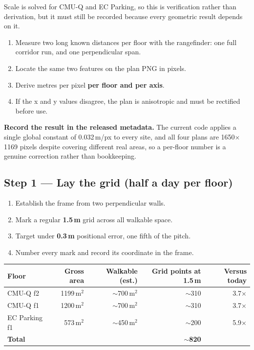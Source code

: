 \documentclass[11pt,a4paper]{article}
\begin{document}
Scale is solved for CMU-Q and EC Parking, so this is verification rather than derivation,
but it must still be recorded because every geometric result depends on it.

\begin{enumerate}
\item Measure two long known distances per floor with the rangefinder: one full corridor
run, and one perpendicular span.
\item Locate the same two features on the plan PNG in pixels.
\item Derive metres per pixel \textbf{per floor and per axis}.
\item If the x and y values disagree, the plan is anisotropic and must be rectified
before use.
\end{enumerate}

\textbf{Record the result in the released metadata.} The current code applies a single
global constant of 0.032\,m/px to every site, and all four plans are 1650$\times$1169
pixels despite covering different real areas, so a per-floor number is a genuine
correction rather than bookkeeping.

\subsection{Step 1 --- Lay the grid (half a day per floor)}

\begin{enumerate}
\item Establish the frame from two perpendicular walls.
\item Mark a regular \textbf{1.5\,m} grid across all walkable space.
\item Target under \textbf{0.3\,m} positional error, one fifth of the pitch.
\item Number every mark and record its coordinate in the frame.
\end{enumerate}

\begin{center}\small
\begin{tabular}{@{}lrrrr@{}}
\toprule
Floor & Gross area & Walkable (est.) & Grid points at 1.5\,m & Versus today \\ \midrule
CMU-Q f2 & 1199\,m$^2$ & $\sim$700\,m$^2$ & $\sim$310 & 3.7$\times$ \\
CMU-Q f1 & 1200\,m$^2$ & $\sim$700\,m$^2$ & $\sim$310 & 3.7$\times$ \\
EC Parking f1 & 573\,m$^2$ & $\sim$450\,m$^2$ & $\sim$200 & 5.9$\times$ \\
\midrule
\textbf{Total} & & & \textbf{$\sim$820} & \\
\bottomrule
\end{tabular}
\end{center}
\end{document}
